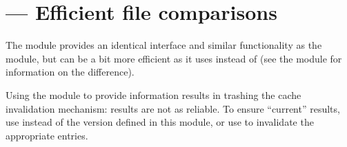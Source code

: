 \section{ ---
         Efficient file comparisons}


The  module provides an identical interface and similar
functionality as the  module, but can be a bit more efficient
as it uses  instead of 
(see the  module for information on the
difference).

  Using the  module to provide
 information results in trashing the cache
invalidation mechanism: results are not as reliable.  To ensure
``current'' results, use  instead of the version
defined in this module, or use  to
invalidate the appropriate entries.
